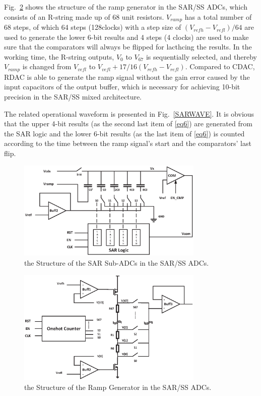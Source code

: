 \documentclass[conference]{IEEEtran}
\begin{document}
Fig.~\ref{RRAMP} shows the structure of the ramp generator in the SAR/SS ADCs, which consists of an R-string made up of 68 unit resistors. $V_{ramp}$ has a total number of 68 steps,
of which 64 steps (128clocks) with a step size of $(V_{refh}-V_{refl})/64$ are used to generate the lower 6-bit results and 4 steps (4 clocks) are used to make sure that the comparators 
will always be flipped for lacthcing the results. In the working time, the R-string outputs, $V_{0}$ to $V_{67}$ is sequentially selected, and thereby $V_{ramp}$ is changed 
from $V_{vefl}$ to $V_{vefl}+17/16(V_{refh}-V_{refl})$. Compared to CDAC, RDAC is able to generate the ramp signal without the gain error caused by the input capacitors of the output buffer, 
which is necessary for achieving 10-bit precision in the SAR/SS mixed architecture.

The related operational waveform is presented in Fig.~\ref{SARWAVE}. It is obvious that the upper 4-bit results (as the second last item of \eqref{eq6}) are generated from the SAR logic and 
the lower 6-bit results (as the last item of \eqref{eq6}) is counted according to the time between the ramp signal’s start and the comparators’ last flip. 
\begin{figure}[htbp]
	\centerline{\includegraphics[width=3.5in]{./Figures/SAR.eps}}
	\caption{the Structure of the SAR Sub-ADCs in the SAR/SS ADCs.}
	\label{SAR}
\end{figure}

\begin{figure}[htbp]
	\centerline{\includegraphics[width=3.5in]{./Figures/RRAMP.eps}}
	\caption{the Structure of the Ramp Generator in the SAR/SS ADCs.}
	\label{RRAMP}
\end{figure} 
\end{document}
